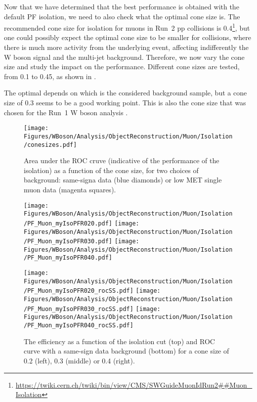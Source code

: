 Now that we have determined that the best performance is obtained with the default PF isolation, we need to also check what the optimal cone size is. The recommended cone size for isolation for muons in
Run~2 pp collisions is 0.4\footnote{\url{https://twiki.cern.ch/twiki/bin/view/CMS/SWGuideMuonIdRun2##Muon_Isolation}}, but one could possibly expect the optimal cone size to be smaller for \pPb collisions, where there is much more activity from the underlying event, affecting indifferently the W boson signal and the multi-jet background. Therefore, we now vary the cone size and study the impact on the performance. Different cone sizes are tested, from 0.1 to 0.45, as shown in .

The optimal depends on which is the considered background sample, but a cone size of 0.3 seems to be a good working point. This is also the cone size that was chosen for the Run~1 \pPb W boson analysis \cite{HIN-13-007}.
 
 \begin{figure}[htbp]
 \begin{center}
  \texttt{[image: Figures/WBoson/Analysis/ObjectReconstruction/Muon/Isolation/conesizes.pdf]}
 \end{center}
 
 \caption{\label{fig:isocones} Area under the ROC cruve (indicative of the performance of the isolation) as a function of the cone size, for two choices of background: same-signa data (blue diamonds) or low MET single muon data
 (magenta squares).}
\end{figure}

\begin{figure}[htbp]
 
 \begin{center}
 \texttt{[image: Figures/WBoson/Analysis/ObjectReconstruction/Muon/Isolation/PF\_Muon\_myIsoPFR020.pdf]}
 \texttt{[image: Figures/WBoson/Analysis/ObjectReconstruction/Muon/Isolation/PF\_Muon\_myIsoPFR030.pdf]}
 \texttt{[image: Figures/WBoson/Analysis/ObjectReconstruction/Muon/Isolation/PF\_Muon\_myIsoPFR040.pdf]}
 
 \texttt{[image: Figures/WBoson/Analysis/ObjectReconstruction/Muon/Isolation/PF\_Muon\_myIsoPFR020\_rocSS.pdf]}
 \texttt{[image: Figures/WBoson/Analysis/ObjectReconstruction/Muon/Isolation/PF\_Muon\_myIsoPFR030\_rocSS.pdf]}
 \texttt{[image: Figures/WBoson/Analysis/ObjectReconstruction/Muon/Isolation/PF\_Muon\_myIsoPFR040\_rocSS.pdf]}
 \end{center}
 
 \caption{\label{fig:isoConesSS}The efficiency as a function of the isolation cut (top) and ROC curve with a same-sign data background (bottom) for a cone size of 0.2 (left), 0.3 (middle) or 0.4 (right).}
\end{figure}

